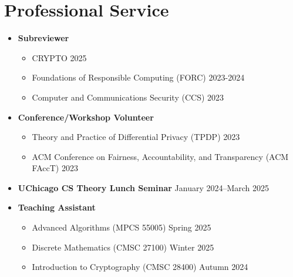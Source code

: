
\section*{Professional Service}

\begin{itemize}
    \item \textbf{Subreviewer}
    \begin{itemize}
        \item CRYPTO \hfill 2025
        \item Foundations of Responsible Computing (FORC) \hfill 2023-2024
        \item Computer and Communications Security (CCS) \hfill 2023
    \end{itemize}
    \item \textbf{Conference/Workshop Volunteer}
    \begin{itemize}
        \item Theory and Practice of Differential Privacy (TPDP) \hfill 2023
        \item ACM Conference on Fairness, Accountability, and Transparency (ACM FAccT) \hfill 2023
    \end{itemize}
    \item \textbf{UChicago CS Theory Lunch Seminar} \hfill January 2024--March 2025
    \item \textbf{Teaching Assistant}
    \begin{itemize}
        \item Advanced Algorithms (MPCS 55005) \hfill Spring 2025
        \item Discrete Mathematics (CMSC 27100) \hfill Winter 2025
        \item Introduction to Cryptography (CMSC 28400) \hfill Autumn 2024
    \end{itemize}
\end{itemize}

